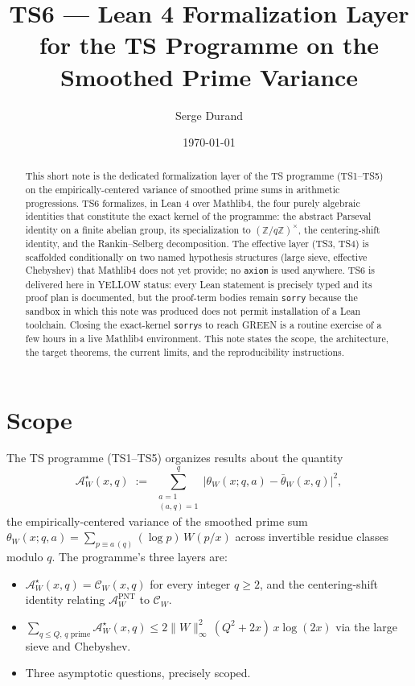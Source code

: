 \documentclass[11pt,a4paper]{article}
\title{TS6 --- Lean 4 Formalization Layer\\
for the TS Programme on the Smoothed Prime Variance}
\author{Serge Durand}
\date{\today}
\newcommand{\AWs}{\mathcal{A}_W^\star}
\newcommand{\AWP}{\mathcal{A}_W^{\mathrm{PNT}}}
\newcommand{\CW}{\mathcal{C}_W}
\begin{document}
\maketitle

\begin{abstract}
This short note is the dedicated formalization layer of the TS programme
(TS1--TS5) on the empirically-centered variance of smoothed prime sums in
arithmetic progressions. TS6 formalizes, in Lean 4 over Mathlib4, the four
purely algebraic identities that constitute the exact kernel of the
programme: the abstract Parseval identity on a finite abelian group, its
specialization to $(\mathbb Z/q\mathbb Z)^\times$, the centering-shift
identity, and the Rankin--Selberg decomposition. The effective layer
(TS3, TS4) is scaffolded conditionally on two named hypothesis structures
(large sieve, effective Chebyshev) that Mathlib4 does not yet provide; no
\texttt{axiom} is used anywhere. TS6 is delivered here in YELLOW status:
every Lean statement is precisely typed and its proof plan is documented,
but the proof-term bodies remain \texttt{sorry} because the sandbox in
which this note was produced does not permit installation of a Lean
toolchain. Closing the exact-kernel \texttt{sorry}s to reach GREEN is a
routine exercise of a few hours in a live Mathlib4 environment. This note
states the scope, the architecture, the target theorems, the current
limits, and the reproducibility instructions.
\end{abstract}

\section{Scope}\label{sec:scope}

The TS programme (TS1--TS5) organizes results about the quantity
\[
\AWs(x,q)
 \;:=\; \sum_{\substack{a = 1 \\ (a,q) = 1}}^{q}
  \bigl|\theta_W(x; q, a) - \bar\theta_W(x, q)\bigr|^{2},
\]
the empirically-centered variance of the smoothed prime sum
$\theta_W(x; q, a) = \sum_{p \equiv a \,(q)} (\log p)\, W(p/x)$ across
invertible residue classes modulo $q$. The programme's three layers are:

\begin{itemize}[leftmargin=2em,nosep]
\item[\textbf{Exact.}] $\AWs(x,q) = \CW(x,q)$ for every integer
  $q \ge 2$, and the centering-shift identity relating $\AWP$ to $\CW$.
\item[\textbf{Effective.}] $\sum_{q \le Q,\, q\text{ prime}} \AWs(x,q)
  \le 2\lVert W\rVert_\infty^{2}\,(Q^{2}+2x)\, x\log(2x)$ via the large
  sieve and Chebyshev.
\item[\textbf{Open.}] Three asymptotic questions, precisely scoped.
\end{itemize}
\end{document}
